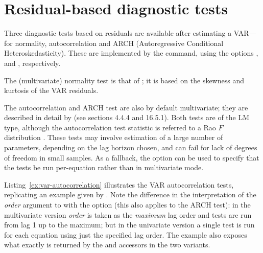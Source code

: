 \section{Residual-based diagnostic tests}

Three diagnostic tests based on residuals are available after
estimating a VAR---for normality, autocorrelation and ARCH
(Autoregressive Conditional Heteroskedasticity). These are implemented
by the  command, using the options ,
 and , respectively.

The (multivariate) normality test is that of \cite{doornik-hansen94};
it is based on the skewness and kurtosis of the VAR residuals.

The autocorrelation and ARCH test are also by default multivariate;
they are described in detail by \cite{Lutkepohl05} (see sections 4.4.4
and 16.5.1). Both tests are of the LM type, although the
autocorrelation test statistic is referred to a Rao $F$ distribution
\citep{Rao73}. These tests may involve estimation of a large number of
parameters, depending on the lag horizon chosen, and can fail for lack
of degrees of freedom in small samples. As a fallback, the
 option can be used to specify that the tests
be run per-equation rather than in multivariate mode.

Listing~\ref{ex:var-autocorrelation} illustrates the VAR autocorrelation
tests, replicating an example given by \citet[p.\ 174]{Lutkepohl05}.
Note the difference in the interpretation of the \textsl{order}
argument to  with the  option (this also
applies to the ARCH test): in the multivariate version \textsl{order}
is taken as the \textit{maximum} lag order and tests are run from lag
1 up to the maximum; but in the univariate version a single test is
run for each equation using just the specified lag order. The example
also exposes what exactly is returned by the  and
 accessors in the two variants.

